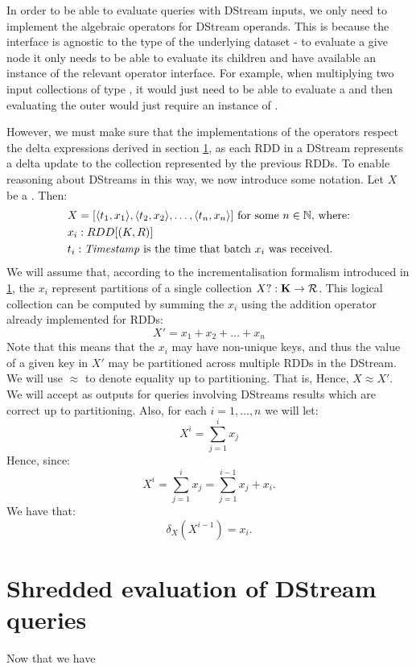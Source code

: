 In order to be able to evaluate queries with DStream inputs, we only need to implement the algebraic operators for DStream operands.  This is because the  interface is agnostic to the type of the underlying dataset - to evaluate a give node it only needs to be able to evaluate its children and have available an instance of the relevant operator interface. For example, when multiplying two input collections of type , it would just need to be able to evaluate a  and then evaluating the outer  would just require an instance of .

However, we must make sure that the implementations of the operators respect the delta expressions derived in section \ref{}, as each RDD in a DStream represents a delta update to the collection represented by the previous RDDs. To enable reasoning about DStreams in this way, we now introduce some notation.
\vs
Let $X$ be a . Then:
\begin{equation*}
\begin{split}
&X = [\langle t_1, x_1 \rangle, \langle t_2, x_2 \rangle, \dots, \langle t_n, x_n \rangle] \textrm{ for some $n \in \mathbb{N}$, where:} \\
&x_i: RDD[(K,R)] \\
&t_i: \textrm{\textit{Timestamp}} \textrm{ is the time that batch $x_i$ was received.}
\end{split}
\end{equation*}
We will assume that, according to the incrementalisation formalism introduced in \ref{}, the $x_i$ represent partitions of a single collection $X?: \mathbf{K} \rightarrow \mathcal{R}$. This logical collection can be computed by summing the $x_i$ using the addition operator already implemented for RDDs:
\begin{equation*}
X' = x_1 + x_2 + \dots + x_n
\end{equation*}
Note that this means that the $x_i$ may have non-unique keys, and thus the value of a given key in $X'$ may be partitioned across multiple RDDs in the DStream.
\vs
We will use $\approx$ to denote equality up to partitioning. That is, Hence, $X \approx X'$. We will accept as outputs for queries involving DStreams results which are correct up to partitioning.
\vs
Also, for each $i = 1, \dots, n$ we will let:
\begin{equation*}
X^i = \sum_{j = 1}^i{x_j}
\end{equation*}
Hence, since:
\begin{equation*}
X^i = \sum_{j = 1}^i{x_j} = \sum_{j = 1}^{i-1}{x_j} + x_i.
\end{equation*}
We have that:
\begin{equation*}
\delta_X(X^{i-1}) = x_i.
\end{equation*}
\section{Shredded evaluation of DStream queries}

Now that we have 